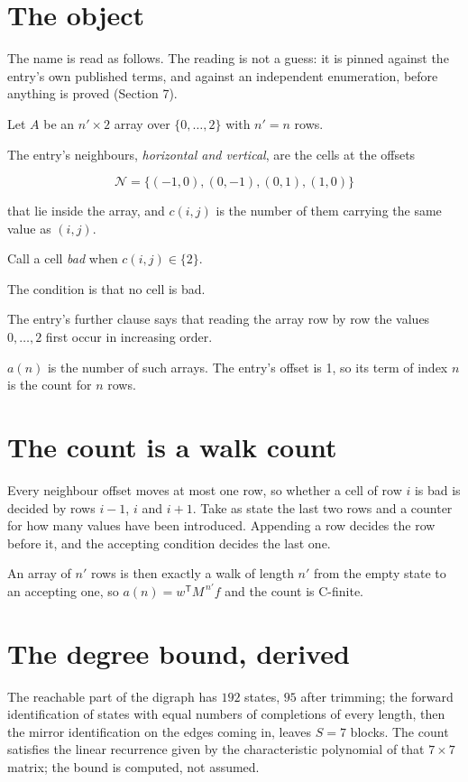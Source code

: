 \documentclass[11pt]{article}
\theoremstyle{definition}
\begin{document}
\section{The object}

The name is read as follows. The reading is not a guess: it is pinned against the entry's own published terms, and against an independent enumeration, before anything is proved (Section 7).

Let $A$ be an $n' \times 2$ array over $\{0,\dots,2\}$ with $n' = n$ rows.

The entry's neighbours, {\itshape horizontal and vertical}, are the cells at the offsets

\[\mathcal{N} = \{(-1,0), (0,-1), (0,1), (1,0)\}\]

that lie inside the array, and $c(i,j)$ is the number of them carrying the same value as $(i,j)$.

Call a cell {\itshape bad} when $c(i,j) \in \{2\}$.

The condition is that no cell is bad.

The entry's further clause says that reading the array row by row the values $0,\dots,2$ first occur in increasing order.

$a(n)$ is the number of such arrays. The entry's offset is 1, so its term of index $n$ is the count for $n$ rows.

\section{The count is a walk count}

Every neighbour offset moves at most one row, so whether a cell of row $i$ is bad is decided by rows $i-1$, $i$ and $i+1$. Take as state the last two rows and a counter for how many values have been introduced. Appending a row decides the row before it, and the accepting condition decides the last one.

An array of $n'$ rows is then exactly a walk of length $n'$ from the empty state to an accepting one, so $a(n) = w^{\mathsf T}M^{\,n'}f$ and the count is C-finite.

\section{The degree bound, derived}

The reachable part of the digraph has $192$ states, $95$ after trimming; the forward identification of states with equal numbers of completions of every length, then the mirror identification on the edges coming in, leaves $S = 7$ blocks. The count satisfies the linear recurrence given by the characteristic polynomial of that $7\times7$ matrix; the bound is computed, not assumed.
\end{document}

